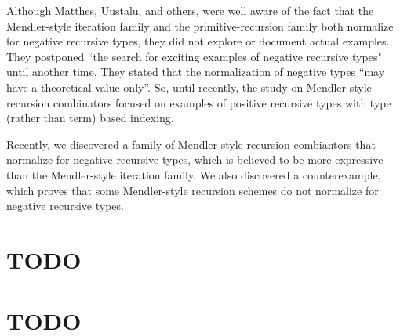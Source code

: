 Although Matthes, Uustalu, and others, were well aware of the fact that
the Mendler-style iteration family and the primitive-recursion family both
normalize for negative recursive types, they did not explore or document actual
examples. They postponed ``the search for exciting examples of negative
recursive types" until another time. They stated that the normalization
of negative types ``may have a theoretical value
only''\cite{UusVen99}. So, until recently, the study on Mendler-style recursion
combinators focused on examples of positive recursive types with type (rather than term) based indexing. %

Recently, we \cite{AhnShe11} discovered a family of Mendler-style recursion
combiantors that normalize for negative recursive types, which is believed to be
more expressive than the Mendler-style iteration family. We \cite{AhnShe11}
also discovered a counterexample, which proves that some Mendler-style recursion
schemes do not normalize for negative recursive types.

\section{TODO}

\section{TODO}


